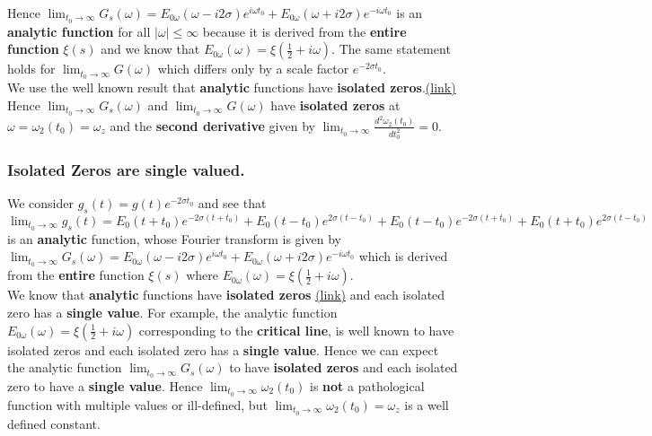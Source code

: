 \documentclass[11pt]{elsarticle}
\begin{document}
Hence $\lim_{t_0 \to \infty} G_s(\omega) = E_{0\omega}(\omega - i 2 \sigma) e^{i \omega t_0} + E_{0\omega}(\omega + i 2 \sigma) e^{-i \omega t_0}$ is an \textbf{analytic function} for all $|\omega| \leq \infty$ because it is derived from the \textbf{entire function} $\xi(s)$ and we know that $E_{0\omega}(\omega) = \xi(\frac{1}{2} + i \omega)$. The same statement holds for $\lim_{t_0 \to \infty} G(\omega)$ which differs only by a scale factor $ e^{-2 \sigma t_0}$.\\

We use the well known result that \textbf{analytic} functions have \textbf{isolated zeros}.\href{https://proofwiki.org/wiki/Zeroes_of_Analytic_Function_are_Isolated}{(link)} Hence $\lim_{t_0 \to \infty} G_s(\omega)$ and $\lim_{t_0 \to \infty} G(\omega)$ have \textbf{isolated zeros} at $\omega=\omega_2(t_0) = \omega_z$ and the \textbf{second derivative}  given by $\lim_{t_0 \to \infty} \frac{d^2 \omega_{2}(t_0)}{dt_0^2} = 0$.

\subsubsection{\label{sec:Section_3_1} \textbf{  Isolated Zeros are single valued. } \protect\\  \lowercase{} }

We consider $g_s(t) = g(t)  e^{-2 \sigma t_0}$ and see that $\lim_{t_0 \to \infty} g_s(t) = E_0(t + t_0) e^{-2 \sigma (t+t_0)} + E_0(t - t_0) e^{2 \sigma (t-t_0)} + E_0(t - t_0) e^{-2 \sigma (t+t_0)} + E_0(t + t_0) e^{2 \sigma (t-t_0)} $ is an \textbf{analytic} function, whose Fourier transform is given by $\lim_{t_0 \to \infty} G_s(\omega) = E_{0\omega}(\omega - i 2 \sigma) e^{i \omega t_0} + E_{0\omega}(\omega + i 2 \sigma) e^{-i \omega t_0}$ which is derived from the \textbf{entire} function $\xi(s)$ where $E_{0\omega}(\omega) = \xi(\frac{1}{2} + i \omega)$.\\

We know that \textbf{analytic} functions have \textbf{isolated zeros} \href{https://proofwiki.org/wiki/Zeroes_of_Analytic_Function_are_Isolated}{(link)} and each isolated zero has a \textbf{single value}.  For example, the analytic function $E_{0\omega}(\omega) = \xi(\frac{1}{2} + i \omega)$ corresponding to the\textbf{ critical line}, is well known to have isolated zeros and each isolated zero  has a \textbf{single value}. Hence we can expect the analytic function $\lim_{t_0 \to \infty} G_s(\omega) $ to  have \textbf{isolated zeros} and each isolated zero to have a \textbf{single value}. Hence $\lim_{t_0 \to \infty}  \omega_2(t_0)$ is \textbf{not }a pathological function with multiple values or ill-defined, but $\lim_{t_0 \to \infty}  \omega_2(t_0) = \omega_z$  is a well defined constant.
\end{document}
